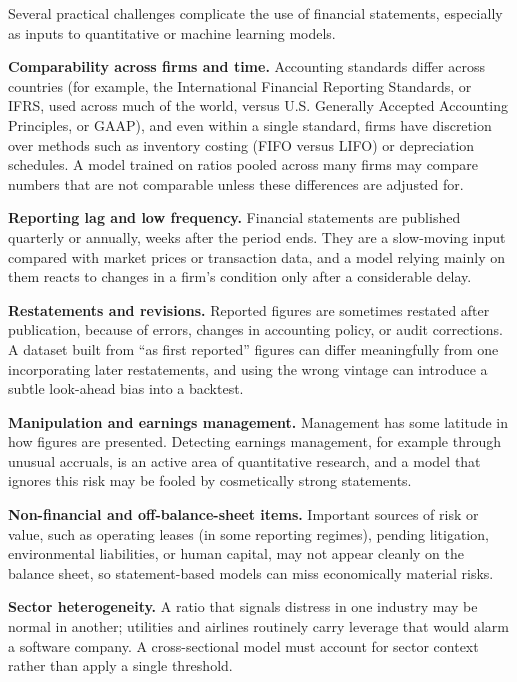 \documentclass[../ai_in_finance]{subfiles}
\begin{document}
Several practical challenges complicate the use of financial statements, especially as inputs to quantitative or machine learning models.

\textbf{Comparability across firms and time.} Accounting standards differ across countries (for example, the International Financial Reporting Standards, or IFRS, used across much of the world, versus U.S. Generally Accepted Accounting Principles, or GAAP), and even within a single standard, firms have discretion over methods such as inventory costing (FIFO versus LIFO) or depreciation schedules. A model trained on ratios pooled across many firms may compare numbers that are not comparable unless these differences are adjusted for.

\textbf{Reporting lag and low frequency.} Financial statements are published quarterly or annually, weeks after the period ends. They are a slow-moving input compared with market prices or transaction data, and a model relying mainly on them reacts to changes in a firm's condition only after a considerable delay.

\textbf{Restatements and revisions.} Reported figures are sometimes restated after publication, because of errors, changes in accounting policy, or audit corrections. A dataset built from ``as first reported'' figures can differ meaningfully from one incorporating later restatements, and using the wrong vintage can introduce a subtle look-ahead bias into a backtest.

\textbf{Manipulation and earnings management.} Management has some latitude in how figures are presented. Detecting earnings management, for example through unusual accruals, is an active area of quantitative research, and a model that ignores this risk may be fooled by cosmetically strong statements.

\textbf{Non-financial and off-balance-sheet items.} Important sources of risk or value, such as operating leases (in some reporting regimes), pending litigation, environmental liabilities, or human capital, may not appear cleanly on the balance sheet, so statement-based models can miss economically material risks.

\textbf{Sector heterogeneity.} A ratio that signals distress in one industry may be normal in another; utilities and airlines routinely carry leverage that would alarm a software company. A cross-sectional model must account for sector context rather than apply a single threshold.
\end{document}

